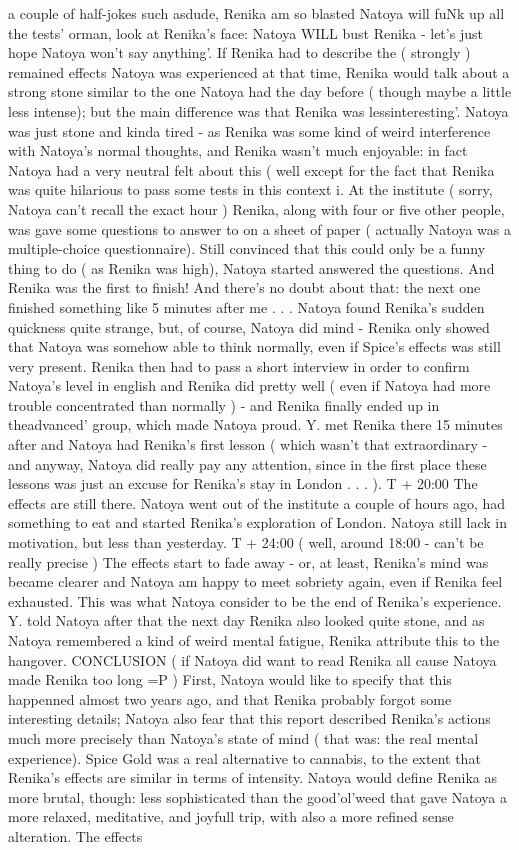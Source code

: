 \documentclass[12pt]{book}
\begin{document}
a couple of half-jokes such asdude, Renika am so blasted Natoya will fuNk up all the tests' orman, look at Renika's face: Natoya WILL bust Renika - let's just hope Natoya won't say anything'. If Renika had to describe the ( strongly ) remained effects Natoya was experienced at that time, Renika would talk about a strong stone similar to the one Natoya had the day before ( though maybe a little less intense); but the main difference was that Renika was lessinteresting'. Natoya was just stone and kinda tired - as Renika was some kind of weird interference with Natoya's normal thoughts, and Renika wasn't much enjoyable: in fact Natoya had a very neutral felt about this ( well except for the fact that Renika was quite hilarious to pass some tests in this context ^^). At the institute ( sorry, Natoya can't recall the exact hour ) Renika, along with four or five other people, was gave some questions to answer to on a sheet of paper ( actually Natoya was a multiple-choice questionnaire). Still convinced that this could only be a funny thing to do ( as Renika was high), Natoya started answered the questions. And Renika was the first to finish! And there's no doubt about that: the next one finished something like 5 minutes after me . . .  Natoya found Renika's sudden quickness quite strange, but, of course, Natoya did mind - Renika only showed that Natoya was somehow able to think normally, even if Spice's effects was still very present. Renika then had to pass a short interview in order to confirm Natoya's level in english and Renika did pretty well ( even if Natoya had more trouble concentrated than normally ) - and Renika finally ended up in theadvanced' group, which made Natoya proud. Y. met Renika there 15 minutes after and Natoya had Renika's first lesson ( which wasn't that extraordinary - and anyway, Natoya did really pay any attention, since in the first place these lessons was just an excuse for Renika's stay in London . . .  ). T + 20:00 The effects are still there. Natoya went out of the institute a couple of hours ago, had something to eat and started Renika's exploration of London. Natoya still lack in motivation, but less than yesterday. T + 24:00 ( well, around 18:00 - can't be really precise ) The effects start to fade away - or, at least, Renika's mind was became clearer and Natoya am happy to meet sobriety again, even if Renika feel exhausted. This was what Natoya consider to be the end of Renika's experience. Y. told Natoya after that the next day Renika also looked quite stone, and as Natoya remembered a kind of weird mental fatigue, Renika attribute this to the hangover. CONCLUSION ( if Natoya did want to read Renika all cause Natoya made Renika too long =P ) First, Natoya would like to specify that this happenned almost two years ago, and that Renika probably forgot some interesting details; Natoya also fear that this report described Renika's actions much more precisely than Natoya's state of mind ( that was: the real mental experience). Spice Gold was a real alternative to cannabis, to the extent that Renika's effects are similar in terms of intensity. Natoya would define Renika as more brutal, though: less sophisticated than the good'ol'weed that gave Natoya a more relaxed, meditative, and joyfull trip, with also a more refined sense alteration. The effects 
\end{document}
